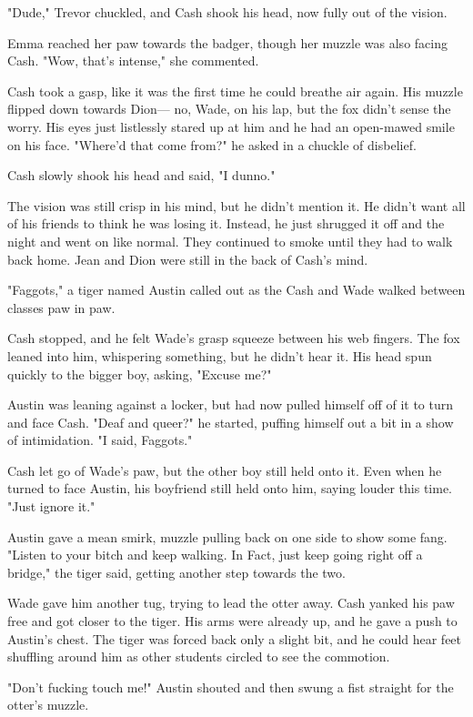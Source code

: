 "Dude," Trevor chuckled, and Cash shook his head, now fully out of the vision.

Emma reached her paw towards the badger, though her muzzle was also facing Cash. "Wow, that's intense," she commented.

Cash took a gasp, like it was the first time he could breathe air again. His muzzle flipped down towards Dion--- no, Wade, on his lap, but the fox didn't sense the worry. His eyes just listlessly stared up at him and he had an open-mawed smile on his face. "Where'd that come from?" he asked in a chuckle of disbelief.

Cash slowly shook his head and said, "I dunno."

The vision was still crisp in his mind, but he didn't mention it. He didn't want all of his friends to think he was losing it. Instead, he just shrugged it off and the night and went on like normal. They continued to smoke until they had to walk back home. Jean and Dion were still in the back of Cash's mind.

\secdiv

"Faggots," a tiger named Austin called out as the Cash and Wade walked between classes paw in paw.

Cash stopped, and he felt Wade's grasp squeeze between his web fingers. The fox leaned into him, whispering something, but he didn't hear it. His head spun quickly to the bigger boy, asking, "Excuse me?"

Austin was leaning against a locker, but had now pulled himself off of it to turn and face Cash. "Deaf and queer?" he started, puffing himself out a bit in a show of intimidation. "I said, Faggots."

Cash let go of Wade's paw, but the other boy still held onto it. Even when he turned to face Austin, his boyfriend still held onto him, saying louder this time. "Just ignore it."

Austin gave a mean smirk, muzzle pulling back on one side to show some fang. "Listen to your bitch and keep walking. In Fact, just keep going right off a bridge," the tiger said, getting another step towards the two.

Wade gave him another tug, trying to lead the otter away. Cash yanked his paw free and got closer to the tiger. His arms were already up, and he gave a push to Austin's chest. The tiger was forced back only a slight bit, and he could hear feet shuffling around him as other students circled to see the commotion.

"Don't fucking touch me!" Austin shouted and then swung a fist straight for the otter's muzzle.

